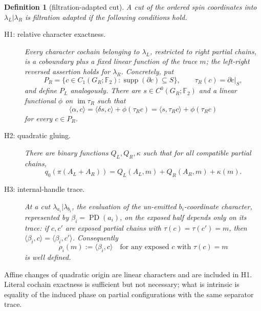 \documentclass[11pt]{article}
\newtheorem{definition}[theorem]{Definition}
\newcommand{\Ftwo}{\mathbb F_2}
\newcommand{\im}{\operatorname{im}}
\newcommand{\supp}{\operatorname{supp}}
\begin{document}
\begin{definition}[filtration-adapted cut]\label{def:adapted}
A cut of the ordered spin coordinates into \(\lambda_L|\lambda_R\) is
\emph{filtration adapted} if the following conditions hold.

\begin{description}
\item[H1: relative character exactness.]
Every character cochain belonging to \(\lambda_L\), restricted to right
partial chains, is a coboundary plus a fixed linear function of the trace
\(m\); the left-right reversed assertion holds for \(\lambda_R\).
Concretely, put
\[
 P_R=\{c\in C_1(G_R;\Ftwo):\supp(\partial c)\subseteq S\},
 \qquad \tau_R(c)=\partial c|_S,
\]
and define \(P_L\) analogously.  There are
\(s\in C^0(G_R;\Ftwo)\) and a linear
functional \(\phi\) on \(\im\tau_R\) such that
\begin{equation}\label{eq:H1}
 \langle\alpha,c\rangle
   =\langle\delta s,c\rangle+\phi(\tau_Rc)
   =\langle s,\tau_Rc\rangle+\phi(\tau_Rc)
\end{equation}
for every \(c\in P_R\).

\item[H2: quadratic gluing.]
There are binary functions \(Q_L,Q_R,\kappa\) such that for all compatible
partial chains,
\begin{equation}\label{eq:H2}
 q_0(\pi(A_L+A_R))
   =Q_L(A_L,m)+Q_R(A_R,m)+\kappa(m).
\end{equation}

\item[H3: internal-handle trace.]
At a cut \(\lambda_{a_i}|\lambda_{b_i}\), the evaluation of the un-emitted
\(b_i\)-coordinate character, represented by
\(\beta_i=\operatorname{PD}(a_i)\), on the exposed
half depends only on its trace: if \(c,c'\)
are exposed partial chains with \(\tau(c)=\tau(c')=m\), then
\(\langle\beta_i,c\rangle=\langle\beta_i,c'\rangle\).  Consequently
\begin{equation}\label{eq:rho}
 \rho_i(m):=\langle\beta_i,c\rangle
 \quad\text{for any exposed }c\text{ with }\tau(c)=m
\end{equation}
is well defined.
\end{description}
\end{definition}

Affine changes of quadratic origin are linear characters and are included in
H1.  Literal cochain exactness is sufficient but not necessary; what is
intrinsic is equality of the induced phase on partial configurations with the
same separator trace.
\end{document}
